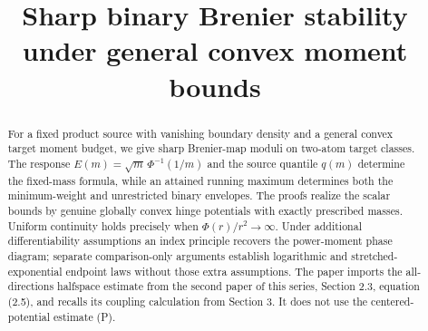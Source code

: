 
\title{Sharp binary Brenier stability\\under general convex moment bounds}

\maketitle
\begin{abstract}
For a fixed product source with vanishing boundary density and a general convex target moment budget, we give sharp Brenier-map moduli on two-atom target classes. The response $E(m)=\sqrt m\,\Phi^{-1}(1/m)$ and the source quantile $q(m)$ determine the fixed-mass formula, while an attained running maximum determines both the minimum-weight and unrestricted binary envelopes. The proofs realize the scalar bounds by genuine globally convex hinge potentials with exactly prescribed masses. Uniform continuity holds precisely when $\Phi(r)/r^2\to\infty$. Under additional differentiability assumptions an index principle recovers the power-moment phase diagram; separate comparison-only arguments establish logarithmic and stretched-exponential endpoint laws without those extra assumptions. The paper imports the all-directions halfspace estimate from the second paper of this series, Section 2.3, equation (2.5), and recalls its coupling calculation from Section 3. It does not use the centered-potential estimate (P).
\end{abstract}
\SourceNote


